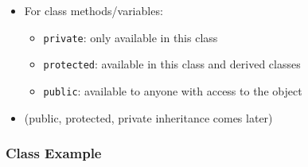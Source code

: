 \begin{itemize}
\itemsep1pt\parskip0pt
\item
  For class methods/variables:

  \begin{itemize}
  \itemsep1pt\parskip0pt
  \item
    \texttt{private}: only available in this class
  \item
    \texttt{protected}: available in this class and derived classes
  \item
    \texttt{public}: available to anyone with access to the object
  \end{itemize}
\item
  (public, protected, private inheritance comes later)
\end{itemize}

\subsubsection{Class Example}\label{class-example-1}

\begin{Shaded}
\begin{Highlighting}[]
 

\NormalTok{: }

    


   \NormalTok{;}
   \NormalTok{;}

   \NormalTok{+(} 

\NormalTok{: }

   
   
\NormalTok{\};}
\end{Highlighting}
\end{Shaded}

